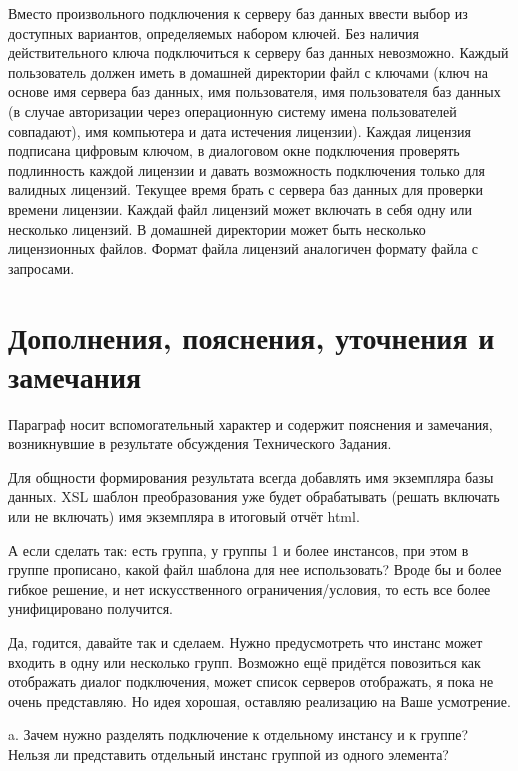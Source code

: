 \documentclass[10pt,a4paper]{article}
\begin{document}
Вместо произвольного подключения к серверу баз данных ввести выбор из доступных
вариантов, определяемых набором ключей. Без наличия действительного ключа
подключиться к серверу баз данных невозможно. Каждый пользователь должен иметь в
домашней директории файл с ключами (ключ на основе имя сервера баз данных, имя
пользователя, имя пользователя баз данных (в случае авторизации через
операционную систему имена пользователей совпадают), имя компьютера и дата
истечения лицензии). Каждая лицензия подписана цифровым ключом, в диалоговом
окне подключения проверять подлинность каждой лицензии и давать возможность
подключения только для валидных лицензий. Текущее время брать с сервера баз
данных для проверки времени лицензии. Каждай файл лицензий может включать в себя
одну или несколько лицензий. В домашней директории может быть несколько
лицензионных файлов. Формат файла лицензий аналогичен формату файла с запросами.

\section{Дополнения, пояснения, уточнения и замечания}

Параграф носит вспомогательный характер и содержит пояснения и замечания,
возникнувшие в результате обсуждения Технического Задания.

Для общности формирования результата всегда добавлять имя экземпляра базы
данных. XSL шаблон преобразования уже будет обрабатывать (решать включать или не
включать) имя экземпляра в итоговый отчёт html.

А если сделать так: есть группа, у группы 1 и более инстансов, при этом в группе
прописано, какой файл шаблона для нее использовать? Вроде бы и более гибкое
решение, и нет искусственного ограничения/условия, то есть все более
унифицировано получится.

Да, годится, давайте так и сделаем. Нужно предусмотреть что инстанс может
входить в одну или несколько групп. Возможно ещё придётся повозиться как
отображать диалог подключения, может список серверов отображать, я пока не очень
представляю. Но идея хорошая, оставляю реализацию на Ваше усмотрение.

a. Зачем нужно разделять подключение к отдельному инстансу и к группе? Нельзя ли
представить отдельный инстанс группой из одного элемента?
\end{document}
